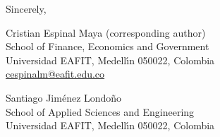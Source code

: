\documentclass[12pt]{article}
\begin{document}
\bigskip

\noindent
Sincerely,

\bigskip\bigskip

\noindent
Cristian Espinal Maya (corresponding author)\\
School of Finance, Economics and Government\\
Universidad EAFIT, Medell\'{\i}n 050022, Colombia\\
\href{mailto:cespinalm@eafit.edu.co}{cespinalm@eafit.edu.co}

\medskip

\noindent
Santiago Jim\'enez Londo\~no\\
School of Applied Sciences and Engineering\\
Universidad EAFIT, Medell\'{\i}n 050022, Colombia
\end{document}

